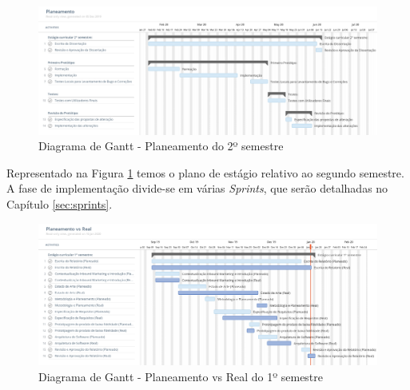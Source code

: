 \begin{figure}[ht!]
	\begin{center}
		\includegraphics[width=1\textwidth]{img/gantt/semestre2.jpeg}
		\caption{Diagrama de Gantt - Planeamento do 2º semestre}
		\label{fig:gantt2}
	\end{center}
\end{figure}

Representado na Figura \ref{fig:gantt2} temos o plano de estágio relativo ao segundo semestre. A fase de implementação divide-se em várias \textit{Sprints}, que serão detalhadas no Capítulo \ref{sec:sprints}.

\newpage

\begin{figure}[ht!]
	\begin{center}
		\includegraphics[width=1\textwidth]{img/gantt/vs.jpeg}
		\caption{Diagrama de Gantt - Planeamento vs Real do 1º semestre}
		\label{fig:ganttvs1}
	\end{center}
\end{figure}

